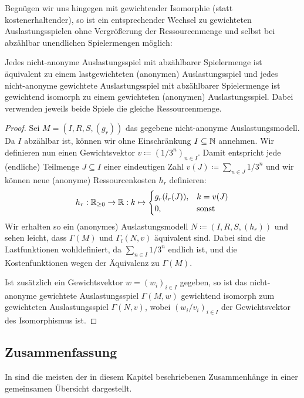 Begnügen wir uns hingegen mit gewichtender Isomorphie (statt kostenerhaltender), so ist ein entsprechender Wechsel zu gewichteten Auslastungsspielen ohne Vergrößerung der Ressourcenmenge und selbst bei abzählbar unendlichen Spielermengen möglich:

\begin{satz}\label{satz:NichtAnonymeAusl}
	Jedes nicht-anonyme Auslastungsspiel mit abzählbarer Spielermenge ist äquivalent zu einem lastgewichteten (anonymen) Auslastungsspiel und jedes nicht-anonyme gewichtete Auslastungsspiel mit abzählbarer Spielermenge ist gewichtend isomorph zu einem gewichteten (anonymen) Auslastungsspiel. Dabei verwenden jeweils beide Spiele die gleiche Ressourcenmenge.
\end{satz}

\begin{proof}
	Sei $M = (I, R, S, (g_r))$ das gegebene nicht-anonyme Auslastungsmodell. Da $I$ abzählbar ist, können wir ohne Einschränkung $I \subseteq \mathbb{N}$ annehmen. Wir definieren nun einen Gewichtsvektor $v \coloneqq (1/3^n)_{n \in I}$. Damit entspricht jede (endliche) Teilmenge $J \subseteq I$ einer eindeutigen Zahl $v(J) \coloneqq \sum_{n \in J} 1/3^n$ und wir können neue (anonyme) Ressourcenkosten $h_r$ definieren:
	\[h_r: \mathbb{R}_{\geq 0} \to \mathbb{R}: k \mapsto \begin{cases}
	g_r(l_r(J)), 	&k = v(J) \\
	0,				&\text{sonst}
	\end{cases} \]
	Wir erhalten so ein (anonymes) Auslastungsmodell $N \coloneqq (I, R, S, (h_r))$ und sehen leicht, dass $\Gamma(M)$ und $\Gamma_l(N, v)$ äquivalent sind. Dabei sind die Lastfunktionen wohldefiniert, da $\sum_{n \in I} 1/3^n$ endlich ist, und die Kostenfunktionen wegen der Äquivalenz zu $\Gamma(M)$. 
	
	Ist zusätzlich ein Gewichtsvektor $w = (w_i)_{i\in I}$ gegeben, so ist das nicht-anonyme gewichtete Auslastungsspiel $\Gamma(M, w)$ gewichtend isomorph zum gewichteten Auslastungsspiel $\Gamma(N, v)$, wobei $(w_i/v_i)_{i \in I}$ der Gewichtsvektor des Isomorphismus ist.
\end{proof}


\subsection{Zusammenfassung}

In  sind die meisten der in diesem Kapitel beschriebenen Zusammenhänge in einer gemeinsamen Übersicht dargestellt.

